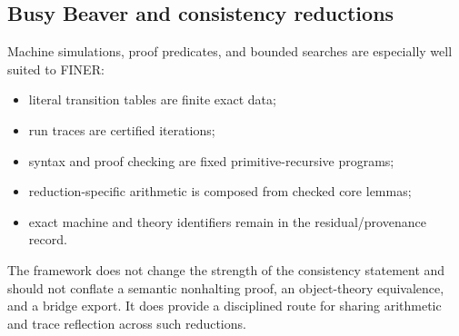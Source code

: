 \subsection{Busy Beaver and consistency reductions}

Machine simulations, proof predicates, and bounded searches are especially well suited to FINER:
\begin{itemize}[leftmargin=2em]
\item literal transition tables are finite exact data;
\item run traces are certified iterations;
\item syntax and proof checking are fixed primitive-recursive programs;
\item reduction-specific arithmetic is composed from checked core lemmas;
\item exact machine and theory identifiers remain in the residual/provenance record.
\end{itemize}
The framework does not change the strength of the consistency statement and should not conflate a semantic nonhalting proof, an object-theory equivalence, and a bridge export.  It does provide a disciplined route for sharing arithmetic and trace reflection across such reductions.
